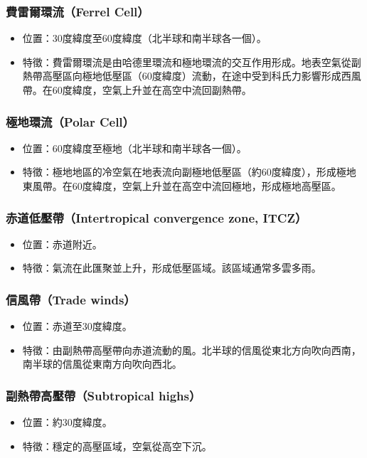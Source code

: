 \documentclass[a4paper,12pt]{report}
\begin{document}
\begin{itemize}
\subsubsection{費雷爾環流（Ferrel Cell）}
\begin{itemize}
  \item 位置：30度緯度至60度緯度（北半球和南半球各一個）。
  \item 特徵：費雷爾環流是由哈德里環流和極地環流的交互作用形成。地表空氣從副熱帶高壓區向極地低壓區（60度緯度）流動，在途中受到科氏力影響形成西風帶。在60度緯度，空氣上升並在高空中流回副熱帶。
\end{itemize}
\subsubsection{極地環流（Polar Cell）}
\begin{itemize}
  \item 位置：60度緯度至極地（北半球和南半球各一個）。
  \item 特徵：極地地區的冷空氣在地表流向副極地低壓區（約60度緯度），形成極地東風帶。在60度緯度，空氣上升並在高空中流回極地，形成極地高壓區。
\end{itemize}
\subsubsection{赤道低壓帶（Intertropical convergence zone, ITCZ）}
\begin{itemize}
  \item 位置：赤道附近。
  \item 特徵：氣流在此匯聚並上升，形成低壓區域。該區域通常多雲多雨。
\end{itemize}
\subsubsection{信風帶（Trade winds）}
\begin{itemize}
  \item 位置：赤道至30度緯度。
  \item 特徵：由副熱帶高壓帶向赤道流動的風。北半球的信風從東北方向吹向西南，南半球的信風從東南方向吹向西北。
\end{itemize}
\subsubsection{副熱帶高壓帶（Subtropical highs）}
\begin{itemize}
  \item 位置：約30度緯度。
  \item 特徵：穩定的高壓區域，空氣從高空下沉。
\end{itemize}

\end{itemize}
\end{document}
